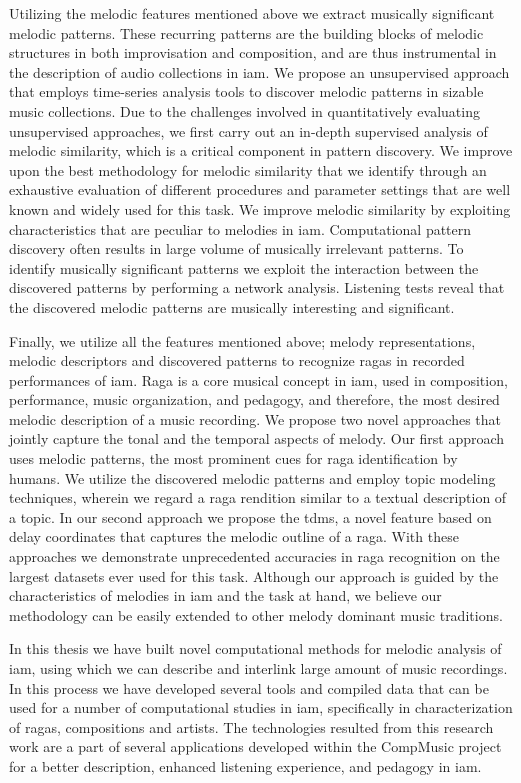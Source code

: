 Utilizing the melodic features mentioned above we extract musically significant melodic patterns. These recurring patterns are the building blocks of melodic structures in both improvisation and composition, and are thus instrumental in the description of audio collections in \gls{iam}. We propose an unsupervised approach that employs time-series analysis tools to discover melodic patterns in sizable music collections. Due to the challenges involved in quantitatively evaluating unsupervised approaches, we first carry out an in-depth supervised analysis of  melodic similarity, which is a critical component in pattern discovery. We improve upon the best methodology for melodic similarity that we identify through an exhaustive evaluation of different procedures and parameter settings that are well known and widely used for this task. We improve melodic similarity by exploiting characteristics that are peculiar to melodies in \gls{iam}. Computational pattern discovery often results in large volume of musically irrelevant patterns. To identify musically significant patterns we exploit the interaction between the discovered patterns by performing a network analysis. Listening tests reveal that the discovered melodic patterns are musically interesting and significant.

Finally, we utilize all the features mentioned above; melody representations, melodic descriptors and discovered patterns to recognize \glspl{raga} in recorded performances of \gls{iam}. Raga is a core musical concept in \gls{iam}, used in composition, performance, music organization, and pedagogy, and therefore, the most desired melodic description of a music recording. We propose two novel approaches that jointly capture the tonal and the temporal aspects of melody. Our first approach uses melodic patterns, the most prominent cues for raga identification by humans. We utilize the discovered melodic patterns and employ topic modeling techniques, wherein we regard a \gls{raga} rendition similar to a textual description of a topic. In our second approach we propose the \gls{tdms}, a novel feature based on delay coordinates that captures the melodic outline of a \gls{raga}. With these approaches we demonstrate unprecedented accuracies in \gls{raga} recognition on the largest datasets ever used for this task.  Although our approach is guided by the characteristics of melodies in \gls{iam} and the task at hand, we believe our methodology can be easily extended to other melody dominant music traditions.

In this thesis we have built novel computational methods for melodic analysis of \gls{iam}, using which we can describe and interlink large amount of music recordings. In this process we have developed several tools and compiled data that can be used for a number of computational studies in \gls{iam}, specifically in characterization of ragas, compositions and artists. The technologies resulted from this research work are a part of several applications developed within the CompMusic project for a better description, enhanced listening experience, and pedagogy in \gls{iam}.

